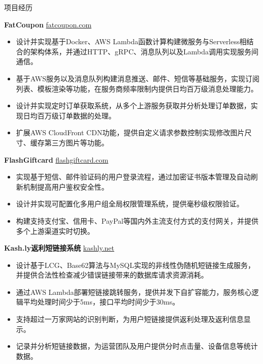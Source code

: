\documentclass{resume} %
\begin{document}
\begin{rSection}{项目经历}
  \vspace{-1.25em}

  \item \textbf{FatCoupon} {} \hfill \href{https://fatcoupon.com}{fatcoupon.com}
  \begin{itemize}
    \itemsep -3pt {}
    \item 设计并实现基于Docker、AWS Lambda函数计算构建微服务与Serverless相结合的架构体系，并通过HTTP、gRPC、消息队列以及Lambda调用实现服务间通信。
    \item 基于AWS服务以及消息队列构建消息推送、邮件、短信等基础服务，实现订阅列表、模板渲染等功能，在服务商频率限制内提供日均百万级消息处理能力。
    \item 设计并实现定时订单获取系统，从多个上游服务获取并分析处理订单数据，实现日均百万级订单数据的处理。
    \item 扩展AWS CloudFront CDN功能，提供自定义请求参数控制实现修改图片尺寸、缓存第三方图片等功能。
  \end{itemize}

  \item \textbf{FlashGiftcard} {} \hfill \href{https://flashgiftcard.com}{flashgiftcard.com}
  \begin{itemize}
    \itemsep -3pt {}
    \item 实现基于短信、邮件验证码的用户登录流程，通过加密证书版本管理及自动刷新机制提高用户鉴权安全性。
    \item 设计并实现可配置化多用户组全局权限管理系统，提供毫秒级权限验证。
    \item 构建支持支付宝、信用卡、PayPal等国内外主流支付方式的支付网关，并提供多个上游渠道实时切换。
  \end{itemize}

  \item \textbf{Kash.ly返利短链接系统} {} \hfill \href{https://kashly.net}{kashly.net}
  \begin{itemize}
    \itemsep -3pt {}
    \item 设计基于LCG、Base62算法与MySQL实现的非线性伪随机短链接生成服务，并提供合法性检查减少错误链接带来的数据库请求资源消耗。
    \item 通过AWS Lambda部署短链接跳转服务，提供并发下自扩容能力，服务核心逻辑平均处理时间少于5ms，接口平均时间少于30ms。
    \item 支持超过一万家网站的识别判断，为用户短链接提供返利处理及返利信息显示。
    \item 记录并分析短链接数据，为运营团队及用户提供分时点击量、设备信息等统计数据。
  \end{itemize}


\end{rSection}
\end{document}
